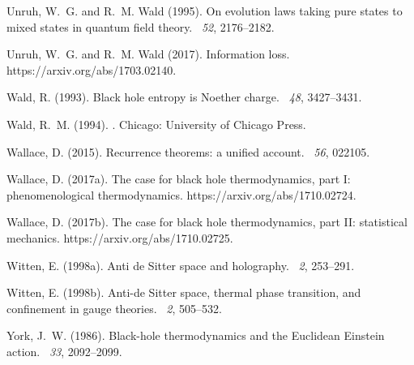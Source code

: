 \documentclass[12pt]{article}
\begin{document}
\begin{thebibliography}{}
Unruh, W.~G. and R.~M. Wald (1995).
\newblock On evolution laws taking pure states to mixed states in quantum field
  theory.
~{\em 52}, 2176--2182.

Unruh, W.~G. and R.~M. Wald (2017).
\newblock Information loss.
\newblock https://arxiv.org/abs/1703.02140.

Wald, R. (1993).
\newblock Black hole entropy is {N}oether charge.
~{\em 48}, 3427--3431.

Wald, R.~M. (1994).
.
\newblock Chicago: University of Chicago Press.

Wallace, D. (2015).
\newblock Recurrence theorems: a unified account.
~{\em 56}, 022105.

Wallace, D. (2017a).
\newblock The case for black hole thermodynamics, part {I}: phenomenological
  thermodynamics.
\newblock https://arxiv.org/abs/1710.02724.

Wallace, D. (2017b).
\newblock The case for black hole thermodynamics, part {II}: statistical
  mechanics.
\newblock https://arxiv.org/abs/1710.02725.

Witten, E. (1998a).
\newblock Anti de {S}itter space and holography.
~{\em 2},
  253--291.

Witten, E. (1998b).
\newblock Anti-de {S}itter space, thermal phase transition, and confinement in
  gauge theories.
~{\em 2},
  505--532.

York, J.~W. (1986).
\newblock Black-hole thermodynamics and the {E}uclidean {E}instein action.
~{\em 33}, 2092--2099.

\end{thebibliography}
\end{document}
